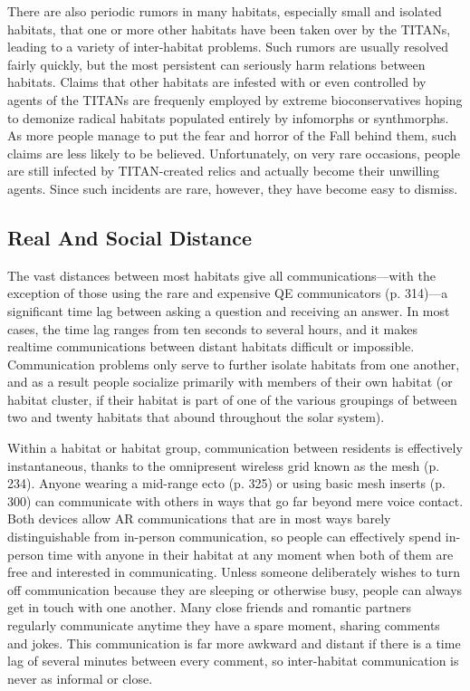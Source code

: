 There are also periodic rumors in many habitats, especially small and isolated habitats, that one or more 
other habitats have been taken over by the TITANs, 
leading to a variety of inter-habitat problems. Such 
rumors are usually resolved fairly quickly, but the 
most persistent can seriously harm relations between 
habitats. Claims that other habitats are infested with 
or even controlled by agents of the TITANs are frequenly employed by extreme bioconservatives hoping 
to demonize radical habitats populated entirely by infomorphs or synthmorphs. As more people manage to 
put the fear and horror of the Fall behind them, such 
claims are less likely to be believed. Unfortunately, 
on very rare occasions, people are still infected by 
TITAN-created relics and actually become their unwilling agents. Since such incidents are rare, however, 
they have become easy to dismiss.

\subsection{Real And Social Distance}

The vast distances between most habitats give all communications—with the exception of those using the 
rare and expensive QE communicators (p. 314)—a 
significant time lag between asking a question and 
receiving an answer. In most cases, the time lag ranges 
from ten seconds to several hours, and it makes realtime communications between distant habitats difficult 
or impossible. Communication problems only serve to 
further isolate habitats from one another, and as a result 
people socialize primarily with members of their own 
habitat (or habitat cluster, if their habitat is part of one 
of the various groupings of between two and twenty 
habitats that abound throughout the solar system).

Within a habitat or habitat group, communication 
between residents is effectively instantaneous, thanks 
to the omnipresent wireless grid known as the mesh 
(p. 234). Anyone wearing a mid-range ecto (p. 325) 
or using basic mesh inserts (p. 300) can communicate 
with others in ways that go far beyond mere voice 
contact. Both devices allow AR communications that 
are in most ways barely distinguishable from in-person communication, so people can effectively spend 
in-person time with anyone in their habitat at any 
moment when both of them are free and interested in 
communicating. Unless someone deliberately wishes 
to turn off communication because they are sleeping 
or otherwise busy, people can always get in touch 
with one another. Many close friends and romantic 
partners regularly communicate anytime they have 
a spare moment, sharing comments and jokes. This 
communication is far more awkward and distant if 
there is a time lag of several minutes between every 
comment, so inter-habitat communication is never as 
informal or close.

